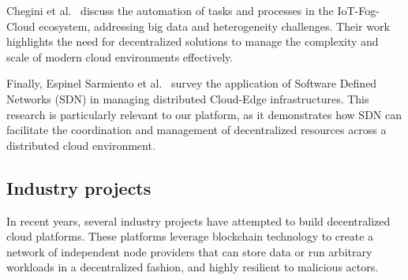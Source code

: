 Chegini et al.~\cite{chegini2021process} discuss the automation of tasks and processes in the IoT-Fog-Cloud ecosystem, addressing big data and heterogeneity challenges. Their work highlights the need for decentralized solutions to manage the complexity and scale of modern cloud environments effectively.

Finally, Espinel Sarmiento et al.~\cite{sarmiento2021decentralized} survey the application of Software Defined Networks (SDN) in managing distributed Cloud-Edge infrastructures. This research is particularly relevant to our platform, as it demonstrates how SDN can facilitate the coordination and management of decentralized resources across a distributed cloud environment.

\subsection{Industry projects}

In recent years, several industry projects have attempted to build decentralized cloud platforms. These platforms leverage blockchain technology to create a network of independent node providers that can store data or run arbitrary workloads in a decentralized fashion, and highly resilient to malicious actors.

